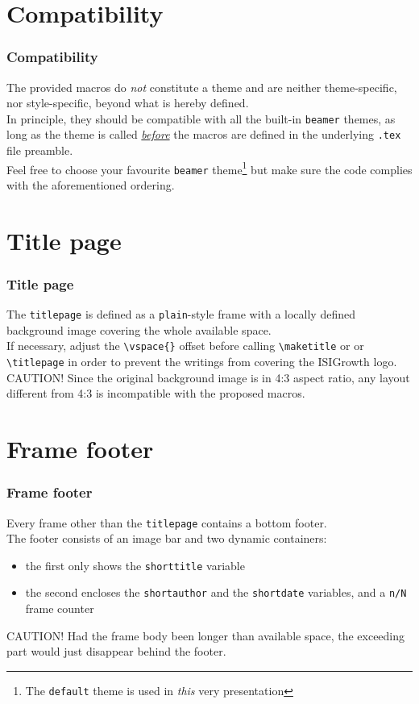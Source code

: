 \documentclass[english]{beamer}
\begin{document}
\section{Compatibility}

\begin{frame}
\frametitle{Compatibility}
The provided macros do \emph{not} constitute a theme and are neither theme-specific, nor style-specific, beyond what is hereby defined.\\
\bigskip 
In principle, they should be compatible with all the built-in \texttt{beamer} themes, as long as the theme is called \underline{\emph{before}} the macros are defined in the underlying \texttt{.tex} file preamble.\\
\bigskip
Feel free to choose your favourite \texttt{beamer} theme\footnote{The \texttt{default} theme is used in \emph{this} very presentation} but make sure the code complies with the aforementioned ordering.
\end{frame}

\section{Title page}

\begin{frame}[fragile]
\frametitle{Title page}
The \texttt{titlepage} is defined as a \texttt{plain}-style frame with a locally defined background image covering the whole available space.\\
\bigskip
If necessary, adjust the \verb|\vspace{}| offset before calling \verb|\maketitle| or or \verb|\titlepage| in order to prevent the writings from covering the ISIGrowth logo.\\
\bigskip
CAUTION! Since the original background image is in 4:3 aspect ratio, any layout different from 4:3 is incompatible with the proposed macros.
\end{frame}

\section{Frame footer}

\begin{frame}
\frametitle{Frame footer}
Every frame other than the \texttt{titlepage} contains a bottom footer.\\
\bigskip
The footer consists of an image bar and two dynamic containers:
\begin{itemize}
\item the first only shows the \texttt{shorttitle} variable\
\item the second encloses the \texttt{shortauthor} and the \texttt{shortdate} variables, and a \texttt{n/N} frame counter
\end{itemize}
\bigskip
CAUTION! Had the frame body been longer than available space, the exceeding part would just disappear behind the footer.
\end{frame}
\end{document}
